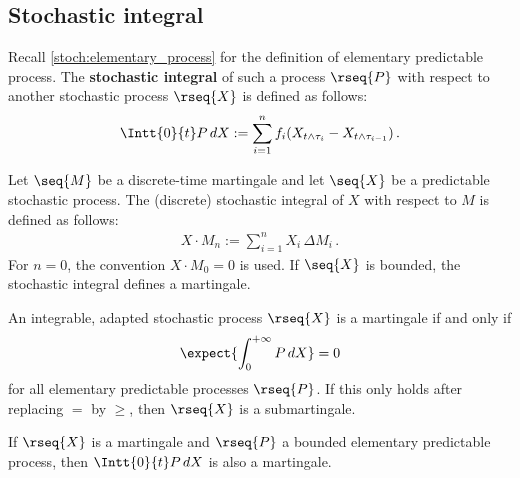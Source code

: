 \subsection{Stochastic integral}

    Recall \cref{stoch:elementary_process} for the definition of elementary predictable process. The \textbf{stochastic integral} of such a process $\rseq{P}$ with respect to another stochastic process $\rseq{X}$ is defined as follows:
    \begin{gather}
        \label{stoch:elementary_integral}
        \Intt{0}{t}P\,dX := \sum_{i=1}^nf_i(X_{t\land\tau_i} - X_{t\land\tau_{i-1}})\,.
    \end{gather}

    \begin{example}
        Let $\seq{M}$ be a discrete-time martingale and let $\seq{X}$ be a predictable stochastic process. The (discrete) stochastic integral of $X$ with respect to $M$ is defined as follows:
        \begin{gather}
            X\cdot M_n := \sum_{i=1}^nX_i\,\Delta M_i\,.
        \end{gather}
        For $n=0$, the convention $X\cdot M_0=0$ is used. If $\seq{X}$ is bounded, the stochastic integral defines a martingale.
    \end{example}

    \begin{property}
        An integrable, adapted stochastic process $\rseq{X}$ is a martingale if and only if
        \begin{gather}
            \expect{\int_0^{+\infty}P\,dX}=0
        \end{gather}
        for all elementary predictable processes $\rseq{P}$. If this only holds after replacing $=$ by $\geq$, then $\rseq{X}$ is a submartingale.
    \end{property}

    \begin{property}
        If $\rseq{X}$ is a martingale and $\rseq{P}$ a bounded elementary predictable process, then $\Intt{0}{t}P\,dX$ is also a martingale.
    \end{property}

